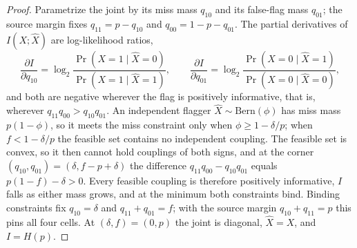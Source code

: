 \documentclass[11pt,a4paper]{article}
\theoremstyle{definition}
\theoremstyle{plain}
\begin{document}
\begin{proof}
\setlength{\parskip}{4pt plus 1pt}
Parametrize the joint by its miss mass $q_{10}$ and its false-flag mass
$q_{01}$; the source margin fixes $q_{11}=p-q_{10}$ and $q_{00}=1-p-q_{01}$.
The partial derivatives of $I(X;\hat X)$ are log-likelihood ratios,
\[
\frac{\partial I}{\partial q_{10}}=\log_2\frac{\Pr(X{=}1\mid\hat X{=}0)}{\Pr(X{=}1\mid\hat X{=}1)},
\qquad
\frac{\partial I}{\partial q_{01}}=\log_2\frac{\Pr(X{=}0\mid\hat X{=}1)}{\Pr(X{=}0\mid\hat X{=}0)},
\]
and both are negative wherever the flag is positively informative, that is,
wherever $q_{11}q_{00}>q_{10}q_{01}$. An independent flagger
$\hat X\sim\mathrm{Bern}(\phi)$ has miss mass $p(1-\phi)$, so it meets the miss
constraint only when $\phi\ge 1-\delta/p$; when $f<1-\delta/p$ the feasible set
contains no independent coupling. The feasible set is convex, so it then cannot
hold couplings of both signs, and at the corner $(q_{10},q_{01})=(\delta,f-p+\delta)$
the difference $q_{11}q_{00}-q_{10}q_{01}$ equals $p(1-f)-\delta>0$. Every
feasible coupling is therefore positively informative, $I$ falls as either mass
grows, and at the minimum both constraints bind.
Binding constraints fix $q_{10}=\delta$ and
$q_{11}+q_{01}=f$; with the source margin $q_{10}+q_{11}=p$ this pins all four
cells.
At $(\delta,f)=(0,p)$ the joint is diagonal, $\hat X=X$, and $I=H(p)$.
\end{proof}
\end{document}
